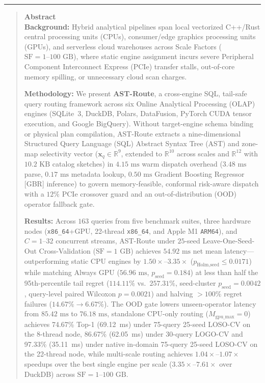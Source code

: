 \documentclass[10pt,a4paper]{article}
\begin{document}
\noindent\rule{\textwidth}{0.8pt}
\begin{quote}
\small\sffamily
\textbf{\color{springerblue}Abstract}\\[0.3em]
\textbf{Background:} Hybrid analytical pipelines span local vectorized C++/Rust central processing units (CPUs), consumer/edge graphics processing units (GPUs), and serverless cloud warehouses across Scale Factors ($\text{SF}=1\text{--}100\text{ GB}$), where static engine assignment incurs severe Peripheral Component Interconnect Express (PCIe) transfer stalls, out-of-core memory spilling, or unnecessary cloud scan charges.

\textbf{Methodology:} We present \textbf{AST-Route}, a cross-engine SQL, tail-safe query routing framework across six Online Analytical Processing (OLAP) engines (SQLite~3, DuckDB, Polars, DataFusion, PyTorch CUDA tensor execution, and Google BigQuery). Without target-engine schema binding or physical plan compilation, AST-Route extracts a nine-dimensional Structured Query Language (SQL) Abstract Syntax Tree (AST) and zone-map selectivity vector ($\mathbf{x}_q \in \mathbb{R}^{9}$, extended to $\mathbb{R}^{10}$ across scales and $\mathbb{R}^{12}$ with $10.2\text{ KB}$ catalog sketches) in $4.15\text{ ms}$ warm dispatch overhead ($3.48\text{ ms}$ parse, $0.17\text{ ms}$ metadata lookup, $0.50\text{ ms}$ Gradient Boosting Regressor [GBR] inference) to govern memory-feasible, conformal risk-aware dispatch with a $12\%$ PCIe crossover guard and an out-of-distribution (OOD) operator fallback gate.

\textbf{Results:} Across $163$ queries from five benchmark suites, three hardware nodes (\texttt{x86\_\allowbreak{}64}+GPU, 22-thread \texttt{x86\_\allowbreak{}64}, and Apple M1 \texttt{ARM64}), and $C=1\text{--}32$ concurrent streams, AST-Route under $25$-seed Leave-One-Seed-Out Cross-Validation ($\text{SF}=1\text{ GB}$) achieves $54.92\text{ ms}$ net mean latency---outperforming static CPU engines by $1.50\times\text{--}3.35\times$ ($p_{\text{Holm,seed}}\le 0.0171$) while matching Always GPU ($56.96\text{ ms}$, $p_{\text{seed}}=0.184$) at less than half the 95th-percentile tail regret ($114.11\%$ vs.\ $257.31\%$, seed-cluster $p_{\text{seed}}=0.0042$, query-level paired Wilcoxon $p=0.0021$) and halving $>100\%$ regret failures ($14.67\%\rightarrow 6.67\%$). The OOD gate lowers unseen-operator latency from $85.42\text{ ms}$ to $76.18\text{ ms}$, standalone CPU-only routing ($M_{\text{gpu\_max}}=0$) achieves 74.67\% Top-1 (69.12~ms) under 75-query 25-seed LOSO-CV on the 8-thread node, 86.67\% (62.05~ms) under 30-query LOGO-CV and 97.33\% (35.11~ms) under native in-domain 75-query 25-seed LOSO-CV on the 22-thread node, while multi-scale routing achieves $\mathbf{1.04\times\text{--}1.07\times}$ speedups over the best single engine per scale ($3.35\times\text{--}7.61\times$ over DuckDB) across $\text{SF}=1\text{--}100\text{ GB}$.


\end{quote}
\end{document}
